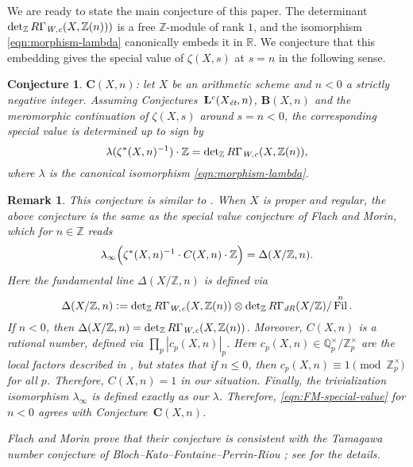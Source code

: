\documentclass[10pt,a4paper,oneside,draft]{article}
\DeclareMathOperator{\Fil}{Fil}
\newcommand{\QQ}{\mathbb{Q}}
\newcommand{\RR}{\mathbb{R}}
\newcommand{\ZZ}{\mathbb{Z}}
\renewcommand{\det}{\operatorname{det}}
\newcommand{\dR}{\text{\it dR}}
\newcommand{\et}{\text{\it \'{e}t}}
\newcommand{\Wc}{\text{\it W,c}}
\newcommand{\dfn}{\mathrel{\mathop:}=}
\theoremstyle{myplain}
\theoremstyle{mydefinition}
\newtheorem{conjecture}[theorem]{Conjecture}
\newtheorem{remark}[theorem]{Remark}
\numberwithin{equation}{section}
\begin{document}
We are ready to state the main conjecture of this paper. The determinant
$\det_\ZZ R\Gamma_\Wc (X, \ZZ (n)))$ is a free $\ZZ$-module of rank $1$, and the
isomorphism \eqref{eqn:morphism-lambda} canonically embeds it in $\RR$. We
conjecture that this embedding gives the special value of $\zeta (X,s)$ at
$s = n$ in the following sense.

\begin{conjecture}
  $\mathbf{C} (X,n)$: let $X$ be an arithmetic scheme and $n < 0$ a strictly
  negative integer. Assuming Conjectures~$\mathbf{L}^c (X_\et, n)$,
  $\mathbf{B} (X,n)$ and the meromorphic continuation of $\zeta (X,s)$ around
  $s = n < 0$, the corresponding special value is determined up to sign by
  \[ \lambda (\zeta^* (X,n)^{-1}) \cdot \ZZ =
    \det_\ZZ R\Gamma_\Wc (X, \ZZ (n)), \]
  where $\lambda$ is the canonical isomorphism \eqref{eqn:morphism-lambda}.
\end{conjecture}

\begin{remark}
  This conjecture is similar to \cite[Conjecture~5.12]{Flach-Morin-2018}.
  When $X$ is proper and regular, the above conjecture is the same as the
  special value conjecture of Flach and Morin, which for $n \in \ZZ$ reads
  \begin{equation}
    \label{eqn:FM-special-value}
    \lambda_\infty \Bigl(\zeta^* (X,n)^{-1} \cdot C (X,n) \cdot \ZZ\Bigr) =
    \Delta (X/\ZZ, n).
  \end{equation}
  Here the fundamental line $\Delta (X/\ZZ,n)$ is defined via
  \[ \Delta (X/\ZZ,n) \dfn
    \det_\ZZ R\Gamma_\Wc (X, \ZZ(n)) \otimes
    \det_\ZZ R\Gamma_\dR (X/\ZZ)/\Fil^n. \]
  If $n < 0$, then
  $\Delta (X/\ZZ,n) = \det_\ZZ R\Gamma_\Wc (X, \ZZ(n))$. Moreover, $C (X,n)$ is
  a rational number, defined via $\prod_p |c_p (X,n)|_p$.
  Here $c_p (X,n) \in \QQ_p^\times/\ZZ_p^\times$ are the local factors
  described in \cite[\S 5.4]{Flach-Morin-2018}, but
  \cite[Proposition~5.8]{Flach-Morin-2018} states that if $n \le 0$, then
  $c_p (X,n) \equiv 1 \pmod{\ZZ_p^\times}$ for all $p$. Therefore, $C (X,n) = 1$
  in our situation. Finally, the trivialization isomorphism $\lambda_\infty$ is
  defined exactly as our $\lambda$. Therefore, \eqref{eqn:FM-special-value} for
  $n < 0$ agrees with Conjecture~$\mathbf{C} (X,n)$.

  Flach and Morin prove that their conjecture is consistent with the Tamagawa
  number conjecture of Bloch--Kato--Fontaine--Perrin-Riou
  \cite{Fontaine-Perrin-Riou-1994}; see \cite[\S 5.6]{Flach-Morin-2018} for the
  details.
\end{remark}
\end{document}
